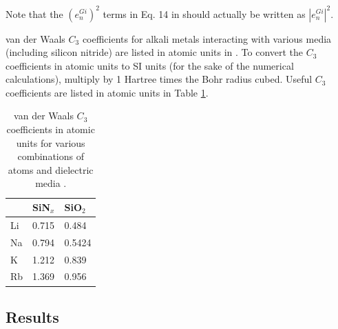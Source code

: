 \documentclass[twocolumn,pra,showpacs,superscriptaddress,longbibliography]{revtex4-1}   %
\begin{document}
Note that the $\left(e_n^{Gi}\right)^2$ terms in Eq. 14 in \cite{Cronin2005} should actually be written as $\left|e_n^{Gi}\right|^2$.

van der Waals $C_3$ coefficients for alkali metals interacting with various media (including silicon nitride) are listed in atomic units in \cite{Arora2014}. To convert the $C_3$ coefficients in atomic units to SI units (for the sake of the numerical calculations), multiply by 1 Hartree times the Bohr radius cubed. Useful $C_3$ coefficients are listed in atomic units in Table \ref{tableC3}.

\begingroup
\begin{table}
\caption{\label{tableC3} van der Waals $C_3$ coefficients in atomic units for various combinations of atoms and dielectric media \cite{Arora2014}.}
\begin{center}
\begin{tabular}{l|ll}
\hline\hline
& SiN$_x$ & SiO$_2$ \\
\hline
Li & 0.715 & 0.484 \\
Na & 0.794 & 0.5424 \\
K &  1.212 & 0.839 \\
Rb & 1.369 & 0.956 \\
\hline\hline
\end{tabular}
\end{center}
\end{table}
\endgroup


\subsection{Results}
\end{document}
